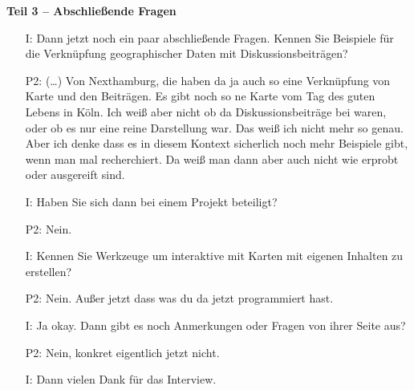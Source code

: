 \textbf{Teil 3 -- Abschlie{\ss}ende Fragen}
\begin{itemize}
    \item[I:] Dann jetzt noch ein paar abschlie{\ss}ende Fragen. Kennen Sie Beispiele f{\"u}r die Verkn{\"u}pfung geographischer Daten mit Diskussionsbeitr{\"a}gen?
    \item[P2:] (\dots) Von Nexthamburg, die haben da ja auch so eine Verkn{\"u}pfung von Karte und den Beitr{\"a}gen. Es gibt noch so ne Karte vom Tag des guten Lebens in K{\"o}ln. Ich wei{\ss} aber nicht ob da Diskussionsbeitr{\"a}ge bei waren, oder ob es nur eine reine Darstellung war. Das wei{\ss} ich nicht mehr so genau. Aber ich denke dass es in diesem Kontext sicherlich noch mehr Beispiele gibt, wenn man mal recherchiert. Da wei{\ss} man dann aber auch nicht wie erprobt oder ausgereift sind.
    \item[I:] Haben Sie sich dann bei einem Projekt beteiligt?
    \item[P2:] Nein.
    \item[I:] Kennen Sie Werkzeuge um interaktive mit Karten mit eigenen Inhalten zu erstellen?
    \item[P2:] Nein. Au{\ss}er jetzt dass was du da jetzt programmiert hast. 
    \item[I:] Ja okay. Dann gibt es noch Anmerkungen oder Fragen von ihrer Seite aus?
    \item[P2:] Nein, konkret eigentlich jetzt nicht.
    \item[I:] Dann vielen Dank f{\"u}r das Interview.
\end{itemize}